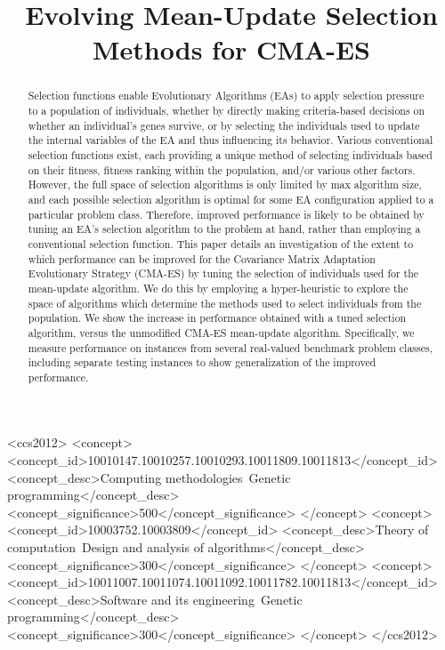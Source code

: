 \documentclass[sigconf]{acmart}
\begin{document}
\title[Evolving Mean-Update Selection Methods for CMA-ES]{Evolving Mean-Update Selection Methods for CMA-ES}


\begin{abstract}
Selection functions enable Evolutionary Algorithms (EAs) to apply selection pressure to a population of individuals, whether by directly making criteria-based decisions on whether an individual's genes survive, or by selecting the individuals used to update the internal variables of the EA and thus influencing its behavior. Various conventional selection functions exist, each providing a unique method of selecting individuals based on their fitness, fitness ranking within the population, and/or various other factors. However, the full space of selection algorithms is only limited by max algorithm size, and each possible selection algorithm is optimal for some EA configuration applied to a particular problem class. Therefore, improved performance is likely to be obtained by tuning an EA's selection algorithm to the problem at hand, rather than employing a conventional selection function. This paper details an investigation of the extent to which performance can be improved for the Covariance Matrix Adaptation Evolutionary Strategy (CMA-ES) by tuning the selection of individuals used for the mean-update algorithm. We do this by employing a hyper-heuristic to explore the space of algorithms which determine the methods used to select individuals from the population. We show the increase in performance obtained with a tuned selection algorithm, versus the unmodified CMA-ES mean-update algorithm. Specifically, we measure performance on instances from several real-valued benchmark problem classes, including separate testing instances to show generalization of the improved performance.

\end{abstract}

%
%


\begin{CCSXML}
	<ccs2012>
	<concept>
	<concept_id>10010147.10010257.10010293.10011809.10011813</concept_id>
	<concept_desc>Computing methodologies~Genetic programming</concept_desc>
	<concept_significance>500</concept_significance>
	</concept>
	<concept>
	<concept_id>10003752.10003809</concept_id>
	<concept_desc>Theory of computation~Design and analysis of algorithms</concept_desc>
	<concept_significance>300</concept_significance>
	</concept>
	<concept>
	<concept_id>10011007.10011074.10011092.10011782.10011813</concept_id>
	<concept_desc>Software and its engineering~Genetic programming</concept_desc>
	<concept_significance>300</concept_significance>
	</concept>
	</ccs2012>
\end{CCSXML}
\end{document}
